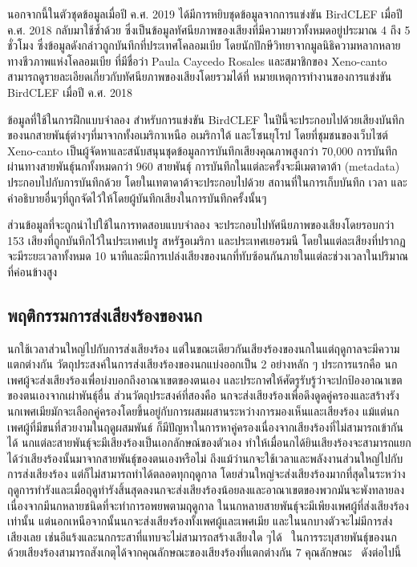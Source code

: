 นอกจากนี้ในตัวชุดข้อมูลเมื่อปี ค.ศ. 2019 ได้มีการหยิบชุดข้อมูลจากการแข่งขัน BirdCLEF เมื่อปี ค.ศ. 2018 กลับมาใช้ซ้ำด้วย ซึ่งเป็นข้อมูลทัศนียภาพของเสียงที่มีความยาวทั้งหมดอยู่ประมาณ 4 ถึง 5 ชั่วโมง ซึ่งข้อมูลดังกล่าวถูกบันทึกที่ประเทศโคลอมเบีย 
โดยนักปักษีวิทยาจากมูลนิธิความหลากหลายทางชีวภาพแห่งโคลอมเบีย ที่มีชื่อว่า Paula Caycedo Rosales และสมาชิกของ Xeno-canto สามารถดูรายละเอียดเกี่ยวกับทัศนียภาพของเสียงโดยรวมได้ที่ หมายเหตุการทำงานของการแข่งขัน BirdCLEF เมื่อปี ค.ศ. 2018~\cite{Goeau2018} \par

ข้อมูลที่ใช้ในการฝึกแบบจำลอง สำหรับการแข่งขัน BirdCLEF ในปีนี้จะประกอบไปด้วยเสียงบันทึกของนกสายพันธุ์ต่างๆที่มาจากทั้งอเมริกาเหนือ อเมริกาใต้ และโซนยุโรป โดยที่ชุมชนของเว็บไซต์ Xeno-canto เป็นผู้จัดหาและสนับสนุนชุดข้อมูลการบันทึกเสียงคุณภาพสูงกว่า 
70,000 การบันทึก ผ่านทางสายพันธุ์นกทั้งหมดกว่า 960 สายพันธุ์ การบันทึกในแต่ละครั้งจะมีเมตาดาต้า (metadata) ประกอบไปกับการบันทึกด้วย โดยในเทตาดาต้าจะประกอบไปด้วย 
สถานที่ในการเก็บบันทึก เวลา และคำอธิบายอื่นๆที่ถูกจัดไว้ให้โดยผู้บันทึกเสียงในการบันทึกครั้งนั้นๆ \par


ส่วนข้อมูลที่จะถูกนำไปใช้ในการทดสอบแบบจำลอง จะประกอบไปทัศนียภาพของเสียงโดยรอบกว่า 153 เสียงที่ถูกบันทึกไว้ในประเทศเปรู สหรัฐอเมริกา และประเทศเยอรมนี โดยในแต่ละเสียงที่ปรากฏ 
จะมีระยะเวลาทั้งหมด 10 นาทีและมีการเปล่งเสียงของนกที่ทับซ้อนกันภายในแต่ละช่วงเวลาในปริมาณที่ค่อนข้างสูง

\subsection{พฤติกรรมการส่งเสียงร้องของนก}
นกใช้เวลาส่วนใหญ่ไปกับการส่งเสียงร้อง แต่ในขณะเดียวกันเสียงร้องของนกในแต่ฤดูกาลจะมีความแตกต่างกัน วัตถุประสงค์ในการส่งเสียงร้องของนกแบ่งออกเป็น 2 อย่างหลัก ๆ ประการแรกคือ นกเพศผู้จะส่งเสียงร้องเพื่อบ่งบอกถึงอาณาเขตของตนเอง 
และประกาศให้ศัตรูรับรู้ว่าจะปกป้องอาณาเขตของตนเองจากเผ่าพันธุ์อื่น ส่วนวัตถุประสงค์ที่สองคือ นกจะส่งเสียงร้องเพื่อดึงดูดคู่ครองและสร้างรัง นกเพศเมียมักจะเลือกคู่ครองโดยขึ้นอยู่กับการผสมผสานระหว่างการมองเห็นและเสียงร้อง 
แม้แต่นกเพศผู้ที่มีขนที่สวยงามในฤดูผสมพันธ์ ก็มีปัญหาในการหาคู่ครองเนื่องจากเสียงร้องที่ไม่สามารถเข้ากันได้ นกแต่ละสายพันธุ์จะมีเสียงร้องเป็นเอกลักษณ์ของตัวเอง 
ทำให้เมื่อนกได้ยินเสียงร้องจะสามารถแยกได้ว่าเสียงร้องนั้นมาจากสายพันธุ์ของตนเองหรือไม่ ถึงแม้ว่านกจะใช้เวลาและพลังงานส่วนใหญ่ไปกับการส่งเสียงร้อง แต่ก็ไม่สามารถทำได้ตลอดทุกฤดูกาล 
โดยส่วนใหญ่จะส่งเสียงร้องมากที่สุดในระหว่างฤดูการทำรังและเมื่อฤดูทำรังสิ้นสุดลงนกจะส่งเสียงร้องน้อยลงและอาณาเขตของพวกมันจะพังทลายลงเนื่องจากมีนกหลายชนิดที่จะทำการอพยพตามฤดูกาล ในนกหลายสายพันธุ์จะมีเพียงเพศผู้ที่ส่งเสียงร้องเท่านั้น 
แต่นอกเหนือจากนั้นนกจะส่งเสียงร้องทั้งเพศผู้และเพศเมีย และในนกบางตัวจะไม่มีการส่งเสียงเลย เช่นอีแร้งและนกกระสาที่แทบจะไม่สามารถสร้างเสียงใด ๆได้~\cite{EarthSky}
ในการระบุสายพันธุ์ของนกด้วยเสียงร้องสามารถสังเกตุได้จากคุณลักษณะของเสียงร้องที่แตกต่างกัน 7 คุณลักษณะ~\cite{Birdingbyear} ดังต่อไปนี้ 

